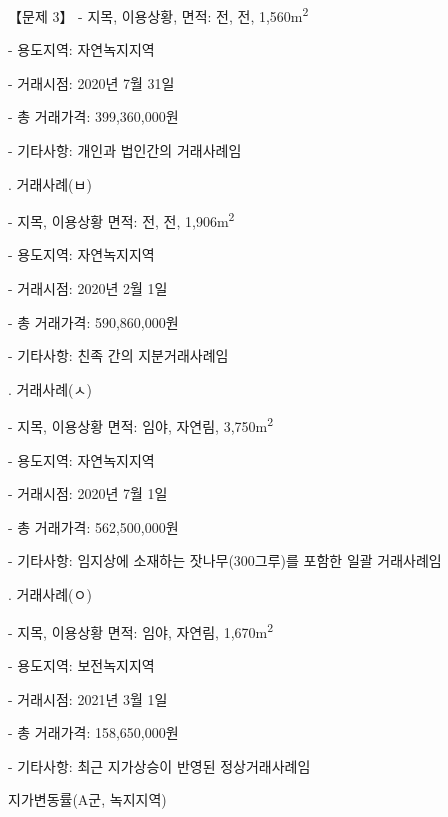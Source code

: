 \begin{longquestion}{【문제 3】}
- 지목, 이용상황, 면적: 전, 전, 1,560m\textsuperscript{2} \par
- 용도지역: 자연녹지지역 \par
- 거래시점: 2020년 7월 31일 \par
- 총 거래가격: 399,360,000원 \par
- 기타사항: 개인과 법인간의 거래사례임 \par
\medskip{}. 거래사례(ㅂ) \par
- 지목, 이용상황 면적: 전, 전, 1,906m\textsuperscript{2} \par
- 용도지역: 자연녹지지역 \par
- 거래시점: 2020년 2월 1일 \par
- 총 거래가격: 590,860,000원 \par
- 기타사항: 친족 간의 지분거래사례임 \par
\medskip{}. 거래사례(ㅅ) \par
- 지목, 이용상황 면적: 임야, 자연림, 3,750m\textsuperscript{2} \par
- 용도지역: 자연녹지지역 \par
- 거래시점: 2020년 7월 1일 \par
- 총 거래가격: 562,500,000원 \par
- 기타사항: 임지상에 소재하는 잣나무(300그루)를 포함한 일괄 거래사례임 \par
\medskip{}. 거래사례(ㅇ) \par
- 지목, 이용상황 면적: 임야, 자연림, 1,670m\textsuperscript{2} \par
- 용도지역: 보전녹지지역 \par
- 거래시점: 2021년 3월 1일 \par
- 총 거래가격: 158,650,000원 \par
- 기타사항: 최근 지가상승이 반영된 정상거래사례임 \par
\medskip{} 지가변동률(A군, 녹지지역) \par
{\small\centering
{}\par}
\vspace{0.5em}
\par{\small\centering
}
\end{longquestion}
